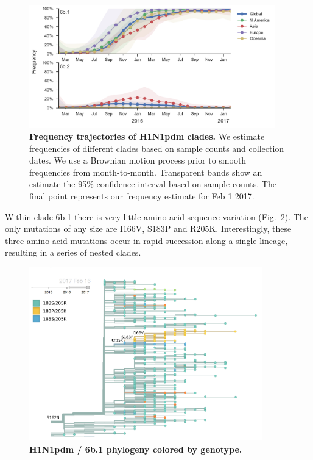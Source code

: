 \documentclass[11pt,oneside,letterpaper]{article}
\begin{document}
\begin{figure}[H]
	\centering
	\includegraphics[width=0.95\textwidth]{../figures/feb-2017/H1N1pdm_clades.png}
	\caption{\textbf{Frequency trajectories of H1N1pdm clades.}
	We estimate frequencies of different clades based on sample counts and collection dates.
	We use a Brownian motion process prior to smooth frequencies from month-to-month.
	Transparent bands show an estimate the 95\% confidence interval based on sample counts.
	The final point represents our frequency estimate for Feb 1 2017.
	}
	\label{H1N1pdm_clades}
\end{figure}

\pagebreak

Within clade 6b.1 there is very little amino acid sequence variation (Fig.\ \ref{H1N1pdm_tree}). The only mutations of any size are I166V, S183P and R205K. Interestingly, these three amino acid mutations occur in rapid succession along a single lineage, resulting in a series of nested clades.

\begin{figure}[H]
	\centering
	\includegraphics[width=0.9\textwidth]{../figures/feb-2017/H1N1pdm_tree.png}
	\caption{\textbf{H1N1pdm / 6b.1 phylogeny colored by genotype.}
	}
	\label{H1N1pdm_tree}
\end{figure}
\end{document}
